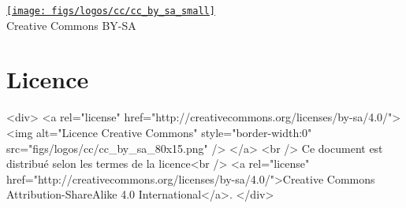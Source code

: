 \ifpdf

    \vfill %
    \begin{center}
        \href{http://creativecommons.org/licenses/by-sa/4.0/}{\texttt{[image: figs/logos/cc/cc\_by\_sa\_small]}}\\
        \small{Creative Commons BY-SA}
    \end{center}

\else

    \section*{Licence}\label{sec:license}

    \begin{rawhtml}

        <div>
            <a rel="license" href="http://creativecommons.org/licenses/by-sa/4.0/">
                <img alt="Licence Creative Commons" style="border-width:0" src="figs/logos/cc/cc_by_sa_80x15.png" />
            </a>
            <br />
            Ce document est distribué selon les termes de la licence<br />
            <a rel="license" href="http://creativecommons.org/licenses/by-sa/4.0/">Creative Commons Attribution-ShareAlike 4.0 International</a>.
        </div>

    \end{rawhtml}

\fi
